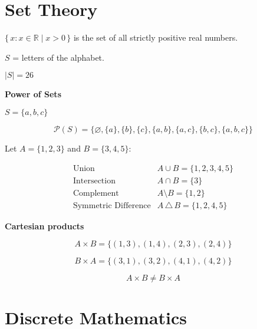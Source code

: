 \section{Set Theory}

\begin{multicols}{2}

$\{\, x : x \in \mathbb{R} \mid x > 0 \,\}$ is the set of all strictly positive real numbers.

$S$ = letters of the alphabet.

$|S| = 26$

\textbf{Power of Sets} 

$S = \{a, b, c\}$  

\[
\mathcal{P}(S) = \big\{ \varnothing, \{a\}, \{b\}, \{c\}, \{a,b\}, \{a,c\}, \{b,c\}, \{a,b,c\} \big\}
\]

Let $A = \{1, 2, 3\}$ and $B = \{3, 4, 5\}$:

\begin{align*}
    \text{Union} & A \cup B = \{1, 2, 3, 4, 5\} \\
    \text{Intersection} & A \cap B = \{3\} \\
    \text{Complement} & A \setminus B = \{1, 2\} \\
    \text{Symmetric Difference} & A \,\triangle\, B = \{1, 2, 4, 5\}
\end{align*}

\textbf{Cartesian products}

\[
A \times B = \{(1,3), (1,4), (2,3), (2,4)\}
\]

\[
B \times A = \{(3,1), (3,2), (4,1), (4,2)\}
\]

\[
A \times B \neq B \times A
\]

\end{multicols}

\newpage

\section{Discrete Mathematics}

